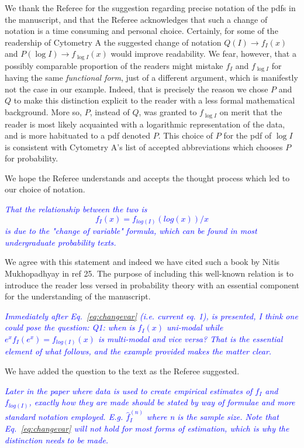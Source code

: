 \documentclass[letter,11pt,draft]{article}
\newcommand{\re}[1]{\emph{\textcolor{blue}{#1}}}
\begin{document}
\smallskip
We thank the Referee for the suggestion regarding precise notation of the pdfs in the manuscript, and that the Referee acknowledges that such a change of notation is a time consuming and personal choice. Certainly, for some of the readership of Cytometry A the suggested change of notation $Q(I)\rightarrow f_I(x)$ and $P(\log I)\rightarrow f_{\log I}(x)$ would improve readability. We fear, however, that a possibly comparable proportion of the readers might mistake $f_I$ and $f_{\log I}$ for having the same \emph{functional form}, just of a different argument, which is manifestly not the case in our example. Indeed, that is precisely the reason we chose $P$ and $Q$ to make this distinction explicit to the reader with a less formal mathematical background. More so, $P$, instead of $Q$, was granted to $f_{\log I}$ on merit that the reader is most likely acquainted with a logarithmic representation of the data, and is more habituated to a pdf denoted $P$. This choice of $P$ for the pdf of $\log I$ is consistent with Cytometry A's list of accepted abbreviations which chooses $P$ for probability.  

\smallskip
We hope the Referee understands and accepts the thought process which led to our choice of notation.

\re{
That the relationship between the two is
\begin{equation}
   f_I(x) = f_{log(I)}(log(x))/x   
        \label{eq:changevar}         
\end{equation}
is due to the "change of variable" formula, which can be found in most undergraduate probability texts. }

\smallskip
We agree with this statement and indeed we have cited such a book by Nitis Mukhopadhyay in ref 25. The purpose of including this well-known relation is to introduce the reader less versed in probability theory with an essential component for the understanding of the manuscript. 

\re{Immediately after Eq.~\ref{eq:changevar}  (i.e.  current eq. 1), is presented, I think one could pose the question: Q1: when is $f_I(x)$ uni-modal while $e^x f_I(e^x)=f_{log(I)}(x)$ is multi-modal and vice versa? That is the essential element of what follows, and the example provided makes the matter clear.}

\smallskip
We have added the question to the text as the Referee suggested.

\re{
Later in the paper where data is used to create empirical estimates of $f_I$ and $f_{log(I)}$, exactly how they are made should be stated by way of formulae and more standard notation employed. E.g. $\hat{f}^{(n)}_I$ where n is the sample size. Note that Eq.~\ref{eq:changevar} will not hold for most forms of estimation, which is why the distinction needs to be made.
}
\end{document}
